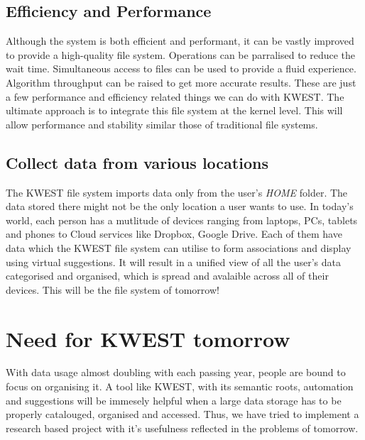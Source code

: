 \subsection*{Efficiency and Performance}
Although the system is both efficient and performant, it can be vastly improved to provide a high-quality file system. Operations can be parralised to reduce the wait time. Simultaneous access to files can be used to provide a fluid experience. Algorithm throughput can be raised to get more accurate results. These are just a few performance and efficiency related things we can do with KWEST. The ultimate approach is to integrate this file system at the kernel level. This will allow performance and stability similar those of traditional file systems.

\subsection*{Collect data from various locations}
The KWEST file system imports data only from the user's \textit{HOME} folder. The data stored there might not be the only location a user wants to use. In today's world, each person has a mutlitude of devices ranging from laptops, PCs, tablets and phones to Cloud services like Dropbox, Google Drive. Each of them have data which the KWEST file system can utilise to form associations and display using virtual suggestions. It will result in a unified view of all the user's data categorised and organised, which is spread and avalaible across all of their devices. This will be the file system of tomorrow!

\section{Need for KWEST tomorrow}
With data usage almost doubling with each passing year, people are bound to focus on organising it. A tool like KWEST,  with its semantic roots, automation and suggestions will be immesely helpful when a large data storage has to be properly catalouged, organised and accessed. Thus, we have tried to implement a research based project with it's usefulness reflected in the problems of tomorrow.